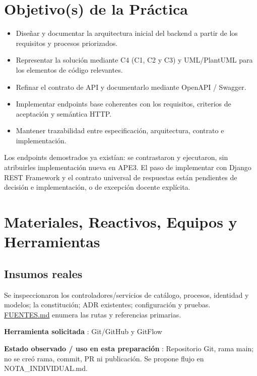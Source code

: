 \documentclass[11pt,a4paper]{article}
\providecommand{\tightlist}{\setlength{\itemsep}{0pt}\setlength{\parskip}{0pt}}
\begin{document}
\section{Objetivo(s) de la
Práctica}\label{informe-objetivos-de-la-pruxe1ctica}

\begin{itemize}
\tightlist
\item
  Diseñar y documentar la arquitectura inicial del backend a partir de
  los requisitos y procesos priorizados.
\item
  Representar la solución mediante C4 (C1, C2 y C3) y UML/PlantUML para
  los elementos de código relevantes.
\item
  Refinar el contrato de API y documentarlo mediante OpenAPI / Swagger.
\item
  Implementar endpoints base coherentes con los requisitos, criterios de
  aceptación y semántica HTTP.
\item
  Mantener trazabilidad entre especificación, arquitectura, contrato e
  implementación.
\end{itemize}

Los endpoints demostrados ya existían: se contrastaron y ejecutaron, sin
atribuirles implementación nueva en APE3. El paso de implementar con
Django REST Framework y el contrato universal de respuestas están
pendientes de decisión e implementación, o de excepción docente
explícita.

\section{Materiales, Reactivos, Equipos y
Herramientas}\label{informe-materiales-reactivos-equipos-y-herramientas}

\subsection{Insumos reales}\label{informe-insumos-reales}

Se inspeccionaron los controladores/servicios de catálogo, procesos,
identidad y modelos; la constitución; ADR existentes; configuración y
pruebas. \url{FUENTES.md} enumera las rutas y referencias primarias.

\textbf{Herramienta solicitada }: Git/GitHub y GitFlow

\textbf{Estado observado / uso en esta preparación }: Repositorio Git,
rama main; no se creó rama, commit, PR ni publicación. Se propone flujo
en NOTA\_INDIVIDUAL.md.
\end{document}
